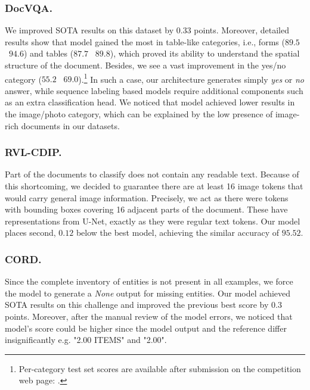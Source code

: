 \documentclass[runningheads]{llncs}
\begin{document}
\subsubsection{DocVQA.}
We improved SOTA results on this dataset by $0.33$ points. 
Moreover, detailed results show that model gained the most in table-like categories, i.e., forms ($89.5$ \textrightarrow~$94.6$) and tables ($87.7$ \textrightarrow~$89.8$), which proved its ability to understand the spatial structure of the document.
Besides, we see a vast improvement in the yes/no category ($55.2$ \textrightarrow~$69.0$).\footnote{Per-category test set scores are available after submission on the competition web page: .}
In such a case, our architecture generates simply \textit{yes} or \textit{no} answer, while sequence labeling based models require additional components such as an extra classification head.
We noticed that model achieved lower results in the image/photo category, which can be explained by the low presence of image-rich documents in our datasets.

\subsubsection{RVL-CDIP.}
Part of the documents to classify does not contain any readable text.
Because of this shortcoming, we decided to guarantee there are at least 16 image tokens that would carry general image information.
Precisely, we act as there were tokens with bounding boxes covering 16 adjacent parts of the document. These have representations from U-Net, exactly as they were regular text tokens. Our model places second, $0.12$ below the best model, achieving the similar accuracy of $95.52$. 



\subsubsection{CORD.}
Since the complete inventory of entities is not present in all examples, we force the model to generate a \textit{None} output for missing entities.
Our model achieved SOTA results on this challenge and improved the previous best score by $0.3$ points.
Moreover, after the manual review of the model errors, we noticed that model's score could be higher since the model output and the reference differ insignificantly e.g. "2.00 ITEMS" and "2.00".
\end{document}
